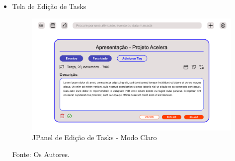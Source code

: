 \documentclass[a4paper,12pt]{article}
\begin{document}
\begin{itemize}
	\item Tela de Edição de Tasks
	\begin{figure}[H]
		\centering
		\includegraphics[scale=0.20]{prototypes/white/Edit Task Panel Window.png}
		\caption{JPanel de Edição de Tasks - Modo Claro}
	\end{figure}
	\noindent Fonte: Os Autores.
\end{itemize}	
\end{document}
